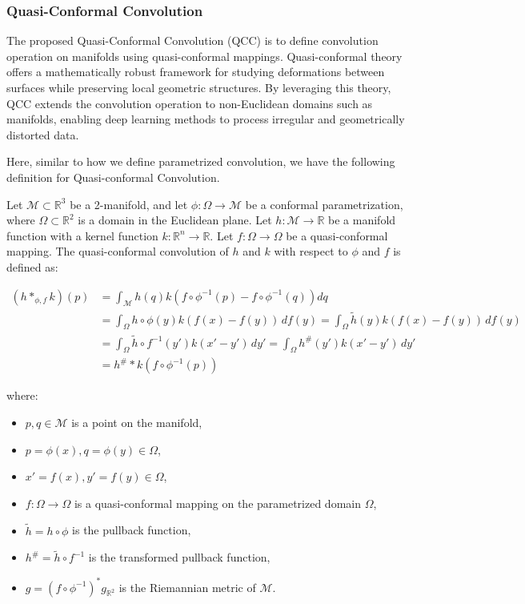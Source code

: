 \subsubsection{Quasi-Conformal Convolution}

The proposed Quasi-Conformal Convolution (QCC) is to define convolution operation on manifolds using quasi-conformal mappings. Quasi-conformal theory offers a mathematically robust framework for studying deformations between surfaces while preserving local geometric structures. By leveraging this theory, QCC extends the convolution operation to non-Euclidean domains such as manifolds, enabling deep learning methods to process irregular and geometrically distorted data.

Here, similar to how we define parametrized convolution, we have the following definition for Quasi-conformal Convolution.

\begin{definition}
Let $\mathcal{M} \subset \mathbb{R}^3$ be a 2-manifold, and let $\phi: \Omega \to \mathcal{M}$ be a conformal parametrization, where $\Omega \subset \mathbb{R}^2$ is a domain in the Euclidean plane. Let $h: \mathcal{M} \to \mathbb{R}$ be a manifold function with a kernel function $k: \mathbb{R}^{n}\to \mathbb{R}$.  Let $f: \Omega \to \Omega$ be a quasi-conformal mapping. The quasi-conformal convolution of $h$ and $k$ with respect to $\phi$ and $f$ is defined as:

\begin{equation}
\begin{aligned}
(h \ast_{\phi, f} k)(p)
&= \int_{\mathcal{M}}h(q)k(f\circ\phi^{-1}(p) - f\circ\phi^{-1}(q)) dq\\
&= \int_{\Omega} h\circ\phi(y) k(f(x) - f(y)) \, df(y) = \int_{\Omega} \tilde{h}(y)k(f(x) - f(y)) \, df(y)\\
&= \int_{\Omega} \tilde{h}\circ f^{-1}(y')k(x' - y') \, dy' = \int_{\Omega} h^\#(y')k(x' - y') \, dy'\\
&= h^\# \ast k(f\circ\phi^{-1}(p))
\label{eq:parametrizedQCC}
\end{aligned}
\end{equation}

where:
\begin{itemize}
    \item $p,q \in \mathcal{M}$ is a point on the manifold,
    \item $p = \phi(x), q = \phi(y) \in \Omega$,
    \item $x'=f(x), y'=f(y) \in \Omega$,
    \item $f:\Omega\to\Omega$ is a quasi-conformal mapping on the parametrized domain $\Omega$,
    \item $\tilde{h}=h\circ\phi$ is the pullback function,
    \item $h^\#=\tilde{h}\circ f^{-1}$ is the transformed pullback function,
    \item $g = (f \circ \phi^{-1})^* g_{\mathbb{R}^2}$ is the Riemannian metric of $\mathcal{M}$.
\end{itemize}
\end{definition}

